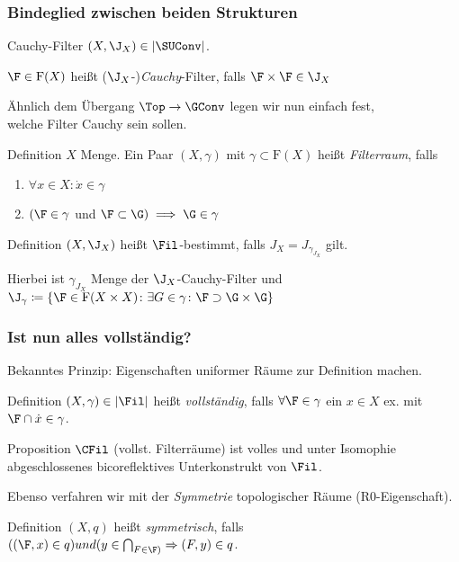 \begin{frame}
  \frametitle{Bindeglied zwischen beiden Strukturen}
  \begin{block}{Cauchy-Filter}
    $(X,\J_X) \in |\SUConv|$.

    $\F \in \mathrm{F}(X)$ heißt ($\J_X$-)\emph{Cauchy}-Filter, falls $\F \times \F \in \J_X$
  \end{block}

  Ähnlich dem Übergang $\Top \to \GConv$ legen wir nun einfach fest,\\ welche Filter Cauchy sein sollen.

  \begin{block}{Definition}
    $X$ Menge. Ein Paar $(X, \gamma)$ mit $\gamma \subset \mathrm{F}(X)$ heißt \emph{Filterraum}, falls
    \begin{enumerate}[F1)]
      \item $\forall x \in X \colon \dot x \in \gamma$
      \item $(\F \in \gamma$ und $\F \subset \G) \implies \G \in \gamma$
    \end{enumerate}
  \end{block}

  \begin{block}{Definition}
    $(X, \J_X)$ heißt $\Fil$-bestimmt, falls $J_X = J_{\gamma_{J_X}}$ gilt. 
    
    Hierbei ist
    $\gamma_{J_X}$ Menge der $\J_X$-Cauchy-Filter und $\J_\gamma \coloneqq \{ \F \in \mathrm{F}(X \times X) \colon \exists G \in \gamma \colon \F \supset \G \times \G\}$
  \end{block}
\end{frame}

\begin{frame}
  \frametitle{Ist nun alles vollständig?}

  Bekanntes Prinzip: Eigenschaften uniformer Räume zur Definition machen.

  \begin{block}{Definition}
    $(X, \gamma) \in |\Fil|$ heißt \emph{vollständig}, falls $\forall \F \in \gamma$ ein $x \in X$ ex. mit $\F \cap \dot x \in \gamma$.
  \end{block}

  \begin{block}{Proposition}
    $\CFil$ (vollst. Filterräume) ist volles und unter Isomophie abgeschlossenes bicoreflektives Unterkonstrukt von $\Fil$.
  \end{block}

  Ebenso verfahren wir mit der \emph{Symmetrie} topologischer Räume (R0-Eigenschaft).

  \begin{block}{Definition}
    $(X,q)$ heißt \emph{symmetrisch}, falls $((\F,x) \in q)  und (y \in \bigcap _{F \in \F)} \Rightarrow (F,y) \in q$.
  \end{block}
\end{frame}

